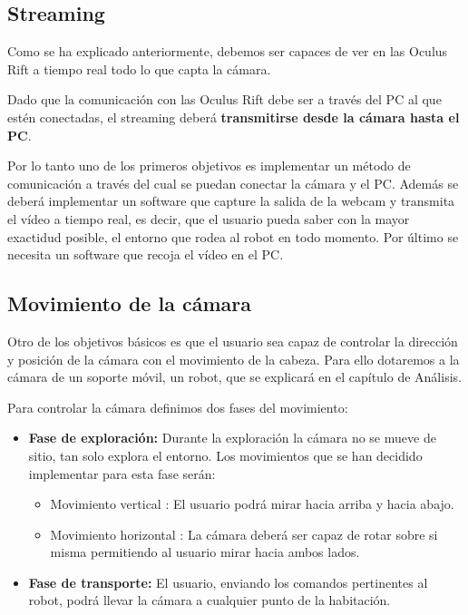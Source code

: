 \documentclass[twoside, 11pt]{epstfg}
\begin{document}
\subsection{Streaming}
Como se ha explicado anteriormente, debemos ser capaces de ver en las Oculus Rift a tiempo real todo lo que capta la cámara.

Dado que la comunicación con las Oculus Rift debe ser a través del PC al que estén conectadas, el streaming deberá \textbf{transmitirse desde la cámara hasta el PC}.

Por lo tanto uno de los primeros objetivos es implementar un método de comunicación a través del cual se puedan conectar  la cámara y el PC. Además se deberá implementar un software que capture la salida de la webcam y transmita el vídeo a tiempo real, es decir, que el usuario pueda saber con la mayor exactidud posible, el entorno que rodea al robot en todo momento. Por último se necesita un software que recoja el vídeo en el PC.

\subsection{Movimiento de la cámara}
Otro de los objetivos básicos es que el usuario sea capaz de controlar la dirección y posición de la cámara con el movimiento de la cabeza. Para ello dotaremos a la cámara de un soporte móvil, un robot, que se explicará en el capítulo de Análisis.

Para controlar la cámara definimos dos fases del movimiento:
\begin{itemize}
	\item \textbf{Fase de exploración:}
	Durante la exploración la cámara no se mueve de sitio, tan solo explora el entorno.
	Los movimientos que se han decidido implementar para esta fase serán:
	\begin{itemize}
		\item Movimiento vertical : El usuario podrá mirar hacia arriba y hacia abajo.
		\item Movimiento horizontal : La cámara deberá ser capaz de rotar sobre si misma permitiendo al usuario mirar hacia ambos lados.
	\end{itemize}
	\item \textbf{Fase de transporte:}
	El usuario, enviando los comandos pertinentes al robot, podrá llevar la cámara a cualquier punto de la habitación.
	
\end{itemize}
\end{document}
